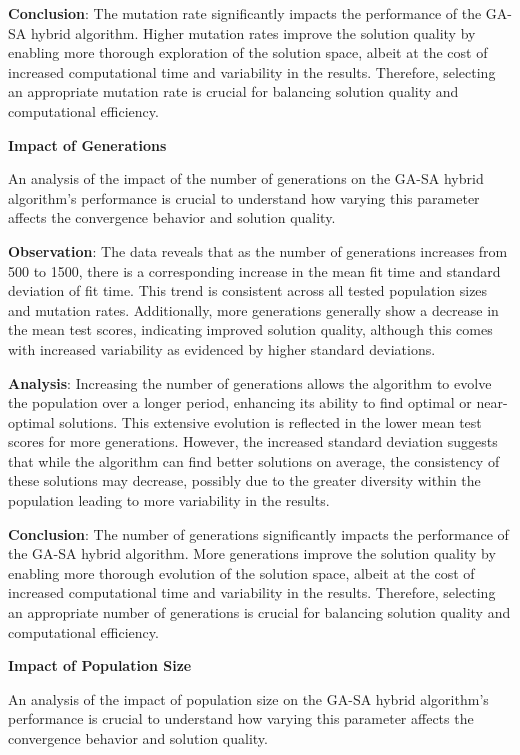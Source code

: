 \documentclass[
]{article}
\begin{document}
    \textbf{Conclusion}: The mutation rate significantly impacts the performance of the GA-SA hybrid algorithm. Higher mutation rates improve the solution quality by enabling more thorough exploration of the solution space, albeit at the cost of increased computational time and variability in the results. Therefore, selecting an appropriate mutation rate is crucial for balancing solution quality and computational efficiency.

    \textbf{Impact of Generations}

    An analysis of the impact of the number of generations on the GA-SA hybrid algorithm’s performance is crucial to understand how varying this parameter affects the convergence behavior and solution quality.

    \textbf{Observation}: The data reveals that as the number of generations increases from 500 to 1500, there is a corresponding increase in the mean fit time and standard deviation of fit time. This trend is consistent across all tested population sizes and mutation rates. Additionally, more generations generally show a decrease in the mean test scores, indicating improved solution quality, although this comes with increased variability as evidenced by higher standard deviations.

    \textbf{Analysis}: Increasing the number of generations allows the algorithm to evolve the population over a longer period, enhancing its ability to find optimal or near-optimal solutions. This extensive evolution is reflected in the lower mean test scores for more generations. However, the increased standard deviation suggests that while the algorithm can find better solutions on average, the consistency of these solutions may decrease, possibly due to the greater diversity within the population leading to more variability in the results.

    \textbf{Conclusion}: The number of generations significantly impacts the performance of the GA-SA hybrid algorithm. More generations improve the solution quality by enabling more thorough evolution of the solution space, albeit at the cost of increased computational time and variability in the results. Therefore, selecting an appropriate number of generations is crucial for balancing solution quality and computational efficiency.

    \textbf{Impact of Population Size}

    An analysis of the impact of population size on the GA-SA hybrid algorithm’s performance is crucial to understand how varying this parameter affects the convergence behavior and solution quality.
\end{document}
